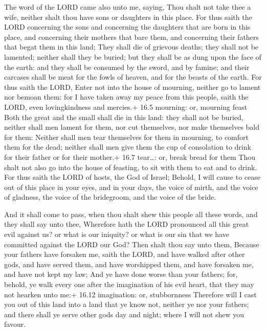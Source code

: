  The word of the LORD came also unto me, saying,
 Thou shalt not take thee a wife, neither shalt thou have
sons or daughters in this place.  For thus saith the LORD
concerning the sons and concerning the daughters that are born in this
place, and concerning their mothers that bare them, and concerning their
fathers that begat them in this land;  They shall die of
grievous deaths; they shall not be lamented; neither shall they be
buried; but they shall be as dung upon the face of the earth: and they
shall be consumed by the sword, and by famine; and their carcases shall
be meat for the fowls of heaven, and for the beasts of the earth.
 For thus saith the LORD, Enter not into the house of
mourning, neither go to lament nor bemoan them: for I have taken away my
peace from this people, saith the LORD, even lovingkindness and
mercies.+ 16.5 mourning: or, mourning feast  Both the great
and the small shall die in this land: they shall not be buried, neither
shall men lament for them, nor cut themselves, nor make themselves bald
for them:  Neither shall men tear themselves for them in
mourning, to comfort them for the dead; neither shall men give them the
cup of consolation to drink for their father or for their mother.+ 16.7
tear\ldots: or, break bread for them  Thou shalt not also go
into the house of feasting, to sit with them to eat and to drink.
 For thus saith the LORD of hosts, the God of Israel;
Behold, I will cause to cease out of this place in your eyes, and in
your days, the voice of mirth, and the voice of gladness, the voice of
the bridegroom, and the voice of the bride.

 And it shall come to pass, when thou shalt shew this
people all these words, and they shall say unto thee, Wherefore hath the
LORD pronounced all this great evil against us? or what is our iniquity?
or what is our sin that we have committed against the LORD our God?
 Then shalt thou say unto them, Because your fathers have
forsaken me, saith the LORD, and have walked after other gods, and have
served them, and have worshipped them, and have forsaken me, and have
not kept my law;  And ye have done worse than your fathers;
for, behold, ye walk every one after the imagination of his evil heart,
that they may not hearken unto me:+ 16.12 imagination: or, stubbornness
 Therefore will I cast you out of this land into a land
that ye know not, neither ye nor your fathers; and there shall ye serve
other gods day and night; where I will not shew you favour.

